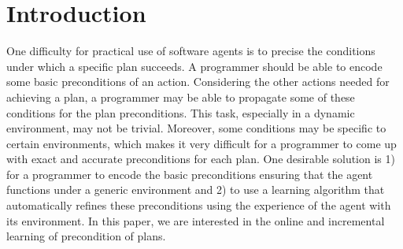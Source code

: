 \documentclass{article}
\begin{document}
 


\begin{abstract} 
\end{abstract} 

\section{Introduction}

 One difficulty for practical use of software agents is to 
precise the
conditions under which a specific plan succeeds. A programmer should
be able to encode some basic preconditions of an action. Considering
the other actions needed for achieving a plan, a programmer may be
able to propagate some of these conditions for the plan preconditions.
This task, especially in a dynamic environment, may not be
trivial. Moreover, some conditions may be specific to certain
environments, which makes it very difficult for a programmer to come
up with exact and accurate preconditions for each plan.  One desirable
solution is 1) for a programmer to encode the basic preconditions
ensuring that the agent functions under a generic environment and 2)
to use a learning algorithm that automatically refines these
preconditions using the experience of the agent with its
environment. In this paper, we are interested in the online and
incremental learning of precondition of plans.
\end{document}
